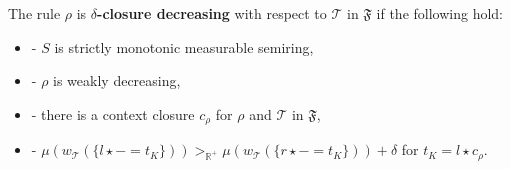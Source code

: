 \begin{definition}
    \noindent
    The rule $\rho$ is
            \textbf{$\delta$-closure decreasing} with respect to $\mathcal{T}$ in $\mathfrak{F}$ if the following hold:
            \begin{itemize}
                \item[]- $S$ is strictly monotonic measurable semiring,
                \item[]- $\rho$ is weakly decreasing,
                \item[]- there is a context closure $c_\rho$ for $\rho$ and $\mathcal{T}$ in $\mathfrak{F}$,
                \item[]- $ \mu(w_\mathcal{T}(\{l \mathop{\star} - \mathop{=} t_K\}))  >_{\mathbb{R}^+}  \mu(w_\mathcal{T}(\{r \mathop{\star} - \mathop{=} t_K\})) \mathop{+}\delta$ for $t_K \mathop{=} l \mathop{\star} c_\rho$.
            \end{itemize}
\end{definition}

